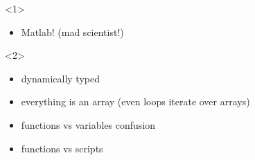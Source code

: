 \begin{frame}[fragile]
\begin{columns}
    \begin{column}{5cm}
      \begin{onlyenv}<1>
        \begin{itemize}
          \item Matlab! (mad scientist!)
        \end{itemize}
      \end{onlyenv}
      \begin{onlyenv}<2>
        \begin{itemize}
          \item dynamically typed
          \item everything is an array (even loops iterate over arrays)
          \item functions vs variables confusion
          \item functions vs scripts
        \end{itemize}
      \end{onlyenv}
    \end{column}
  \end{columns}



\end{frame}





